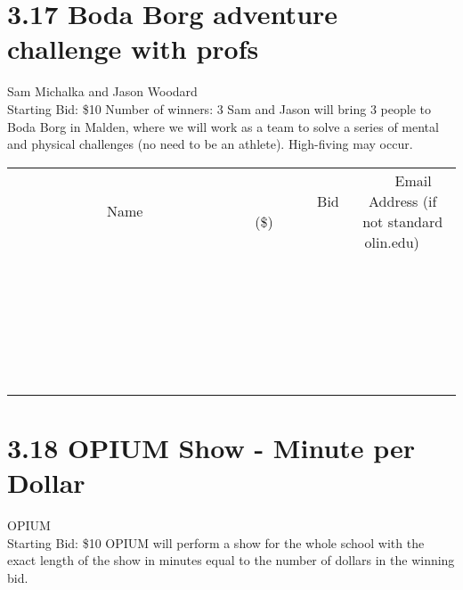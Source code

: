 \documentclass[11pt]{article}
\begin{document}
\section*{3.17 Boda Borg adventure challenge with profs}
Sam Michalka and Jason Woodard
\\
Starting Bid: \$10
\newline
Number of winners: 3
\newline
Sam and Jason will bring 3 people to Boda Borg in Malden, where we will work as a team to solve a series of mental and physical challenges (no need to be an athlete).  High-fiving may occur.
\\[6ex]
\begin{tabular}{c c c}
~~~~~~~~~~~~~Name~~~~~~~~~~~~~ & ~~~~~~~~~Bid (\$)~~~~~~~~~  & ~~~Email Address (if not standard olin.edu)~~~\\
 & & \\
\hline
 & & \\
\hline
 & & \\
\hline
 & & \\
\hline
 & & \\
\hline
 & & \\
\hline
 & & \\
\hline
 & & \\
\hline
 & & \\
\hline
 & & \\
\hline
 & & \\
\hline
 & & \\
\hline
 & & \\
\hline
 & & \\
\hline
 & & \\
\hline
 & & \\
\hline
 & & \\
\hline
 & & \\
\hline
 & & \\
\hline
 & & \\
\hline
 & & \\
\hline
 & & \\
\hline
 & & \\
\hline
 & & \\
\hline
 & & \\
\hline
 & & \\
\hline
\end{tabular}
\newpage
\section*{3.18 OPIUM Show - Minute per Dollar}
OPIUM
\\
Starting Bid: \$10
\newline
OPIUM will perform a show for the whole school with the exact length of the show in minutes equal to the number of dollars in the winning bid.
\end{document}

